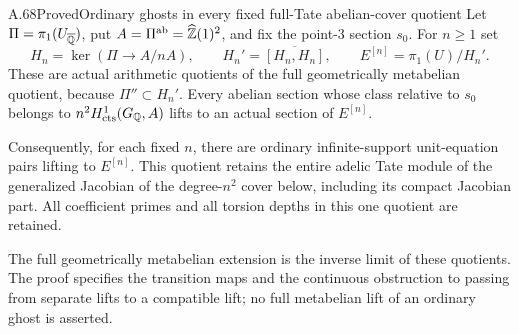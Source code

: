 \begin{statement}{A.68}{Proved}{Ordinary ghosts in every fixed full-Tate abelian-cover quotient}
Let $\Pi=\pi_1(U_{\overline{\mathbb Q}})$, put
$A=\Pi^{\rm ab}=\widehat{\mathbb Z}(1)^2$, and fix the point-$3$ section $s_0$.
For $n\geq1$ set
\[
 H_n=\ker(\Pi\longrightarrow A/nA),\qquad
 H_n'=\overline{[H_n,H_n]},\qquad E^{[n]}=\pi_1(U)/H_n'.
 \tag{A.68.1}
\]
These are actual arithmetic quotients of the full geometrically
metabelian quotient, because $\Pi''\subset H_n'$.
Every abelian section whose class relative to $s_0$ belongs to
$n^2H^1_{\rm cts}(G_\mathbb Q,A)$ lifts to an actual section of $E^{[n]}$.

Consequently, for each fixed $n$, there are ordinary infinite-support
unit-equation pairs lifting to $E^{[n]}$.
This quotient retains the entire adelic Tate module of the generalized
Jacobian of the degree-$n^2$ cover below, including its compact
Jacobian part.  All coefficient primes and all torsion depths in this
one quotient are retained.

The full geometrically metabelian extension is the inverse limit of
these quotients.  The proof specifies the transition maps and the
continuous obstruction to passing from separate lifts to a compatible
lift; no full metabelian lift of an ordinary ghost is asserted.
\end{statement}
